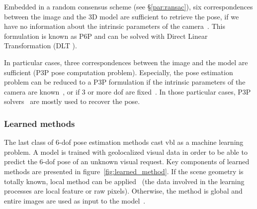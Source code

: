 Embedded in a random consensus scheme (see \S\ref{par:ransac}), six correspondences between the image and the 3D model are sufficient to retrieve the pose, if we have no information about the intrinsic parameters of the camera~\citep{Donoser2014,Li2010,Li2010,Heisterklaus2014}. This formulation is known as P6P and can be solved with Direct Linear Transformation (DLT \citep{Hartley2003}).

In particular cases, three correspondences between the image and the model are sufficient (P3P pose computation problem). Especially, the pose estimation problem can be reduced to a P3P formulation if the intrinsic parameters of the camera are known~\citep{Irschara2009,Middelberg2014}, or if 3 or more \ac{dof} are fixed~\citep{Zeisl2015,Qu2016,Svarm2016,Svarm2014}. In those particular cases, P3P solvers~\citet{Kneip2014opengv} are mostly used to recover the pose.

\subsubsection{Learned methods}


\label{subsubsec:pose_regression}
The last class of 6-\ac{dof} pose estimation methods cast \ac{vbl} as a machine learning problem. A model is trained with geolocalized visual data in order to be able to predict the 6-\ac{dof} pose of an unknown visual request. Key components of learned methods are presented in figure~\ref{fig:learned_method}. If the scene geometry is totally known, local method can be applied~\citep{Shotton2013} (\ie the data involved in the learning processes are local feature or raw pixels). Otherwise, the method is global and entire images are used as input to the model~\citep{Kendall2015}.

